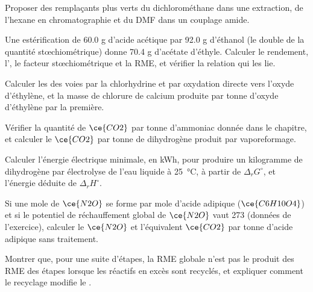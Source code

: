 \begin{exercise}[$\star$]\label{exo:b3:green-industrial:4}
Proposer des remplaçants plus verts du dichlorométhane dans une extraction,
de l'hexane en chromatographie et du DMF dans un couplage amide.
\end{exercise}

\begin{exercise}[$\star\star$]\label{exo:b3:green-industrial:5}
Une estérification de 60.0 g d'acide acétique par 92.0 g d'éthanol (le
double de la quantité stœchiométrique) donne 70.4 g d'acétate d'éthyle.
Calculer le rendement, l', le facteur stœchiométrique et
la RME, et vérifier la relation qui les lie.
\end{exercise}

\begin{exercise}[$\star\star$]\label{exo:b3:green-industrial:6}
Calculer les  des voies par la chlorhydrine et par
oxydation directe vers l'oxyde d'éthylène, et la masse de chlorure de
calcium produite par tonne d'oxyde d'éthylène par la première.
\end{exercise}

\begin{exercise}[$\star\star$]\label{exo:b3:green-industrial:7}
Vérifier la quantité de $\ce{CO2}$ par tonne d'ammoniac donnée dans le chapitre, et calculer le $\ce{CO2}$ par tonne de
dihydrogène produit par vaporeformage.
\end{exercise}

\begin{exercise}[$\star\star$]\label{exo:b3:green-industrial:8}
Calculer l'énergie électrique minimale, en kWh, pour produire un kilogramme de dihydrogène par
électrolyse de l'eau liquide à \qty{25}{\celsius}, à partir de $\Delta_rG^\circ$, et l'énergie déduite de $\Delta_rH^\circ$.
\end{exercise}

\begin{exercise}[$\star\star$]\label{exo:b3:green-industrial:9}
Si une mole de $\ce{N2O}$ se forme par mole d'acide adipique ($\ce{C6H10O4}$) et si le potentiel de réchauffement global
de $\ce{N2O}$ vaut 273 (données de l'exercice), calculer le $\ce{N2O}$ et l'équivalent $\ce{CO2}$
par tonne d'acide adipique sans traitement.
\end{exercise}

\begin{exercise}[$\star\star\star$]\label{exo:b3:green-industrial:10}
Montrer que, pour une suite d'étapes, la RME globale n'est pas le produit
des RME des étapes lorsque les réactifs en excès sont recyclés, et
expliquer comment le recyclage modifie le .
\end{exercise}


